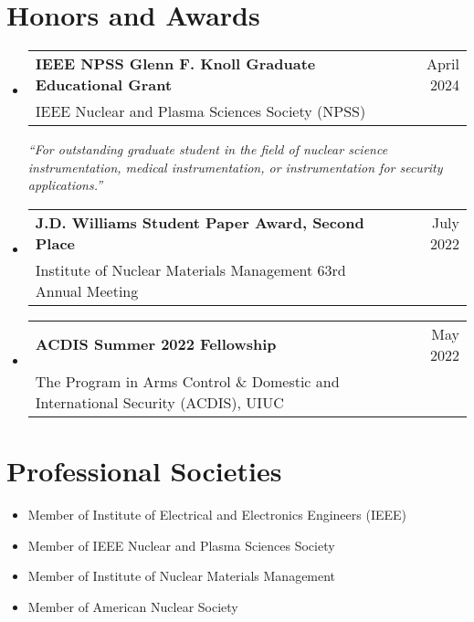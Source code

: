 \documentclass[letterpaper,11pt]{article} %
\makeatletter
\newcommand{\CVSubheading}[4]{
  \vspace{-2pt}\item
    \begin{tabular*}{0.97\textwidth}[t]{l@{\extracolsep{\fill}}r}
      \textbf{#1} & \footnotesize #2 \\
      \footnotesize #3 & \footnotesize #4 \\
    \end{tabular*}\vspace{-7pt}
}
\newcommand{\CVSubHeadingListStart}{\begin{itemize}[leftmargin=0.5cm, label={}]}
\newcommand{\CVSubHeadingListEnd}{\end{itemize}}
\makeatother
\begin{document}
\section{Honors and Awards}
\CVSubHeadingListStart
    \CVSubheading
          {IEEE NPSS Glenn F. Knoll Graduate Educational Grant}{April 2024}
          {IEEE Nuclear and Plasma Sciences Society (NPSS)}{}

    \textit{``For outstanding graduate student in the field of nuclear science instrumentation, medical instrumentation, or instrumentation for security applications.''}
    \CVSubheading
          {J.D. Williams Student Paper Award, Second Place}{July 2022}
          {Institute of Nuclear Materials Management 63rd Annual Meeting}{}
    \CVSubheading
          {ACDIS Summer 2022 Fellowship}{May 2022}
          {The Program in Arms Control \& Domestic and International Security (ACDIS), UIUC}{}
\CVSubHeadingListEnd

\section{Professional Societies}
\begin{itemize}
    \item Member of Institute of Electrical and Electronics Engineers (IEEE)
    \item Member of IEEE Nuclear and Plasma Sciences Society
    \item Member of Institute of Nuclear Materials Management
    \item Member of American Nuclear Society
\end{itemize}
\end{document}

